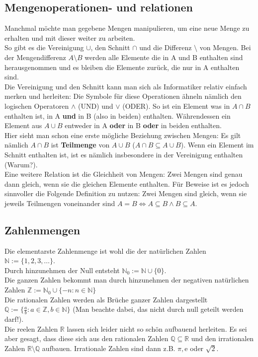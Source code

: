 \documentclass[parskip=full]{scrartcl}
\begin{document}
    \subsection{Mengenoperationen- und relationen}
        Manchmal möchte man gegebene Mengen manipulieren, um eine neue Menge zu erhalten und mit dieser weiter zu arbeiten.
        \\So gibt es die Vereinigung \(\cup\), den Schnitt \(\cap\) und die Differenz \(\setminus\) von Mengen. 
        Bei der Mengendifferenz \(A \setminus B\) werden alle Elemente die in A und B enthalten sind herausgenommen
        und es bleiben die Elemente zurück, die nur in A enthalten sind.
        \\Die Vereinigung und den Schnitt kann man sich als Informatiker relativ einfach merken und herleiten:
        Die Symbole für diese Operationen ähneln nämlich den logischen Operatoren \(\wedge\) (UND) und \(\vee\) (ODER).
        So ist ein Element was in \(A \cap B\) enthalten ist, in A \textbf{und} in B (also in beiden) enthalten. 
        Währendessen ein Element aus \(A \cup B\) entweder in A \textbf{oder} in B \textbf{oder} in beiden enthalten.
        \\Hier sieht man schon eine erste mögliche Beziehung zwischen Mengen: 
        Es gilt nämlich \(A \cap B\) ist \textbf{Teilmenge} von \(A \cup B\) \quad (\(A \cap B \subseteq A \cup B\)).
        Wenn ein Element im Schnitt enthalten ist, ist es nämlich insbesondere in der Vereinigung enthalten (Warum?).
        \\Eine weitere Relation ist die Gleichheit von Mengen: Zwei Mengen sind genau dann gleich, wenn sie die gleichen Elemente enthalten.
        Für Beweise ist es jedoch sinnvoller die Folgende Definition zu nutzen: 
        Zwei Mengen sind gleich, wenn sie jeweils Teilmengen voneinander sind \quad \(A = B \iff A \subseteq B \wedge B \subseteq A\).
        
    \subsection{Zahlenmengen}
        Die elementarste Zahlenmenge ist wohl die der natürlichen Zahlen \(\mathbb{N} := \{1, 2, 3, \dots\}\). 
        \\Durch hinzunehmen der Null entsteht \(\mathbb{N}_0 := \mathbb{N} \cup \{0\}\).
        \\Die ganzen Zahlen bekommt man durch hinzunehmen der negativen natürlichen Zahlen \(\mathbb{Z} := \mathbb{N}_0 \cup \{-n : n \in \mathbb{N}\}\)
        \\Die rationalen Zahlen werden als Brüche ganzer Zahlen dargestellt
        \\\(\mathbb{Q} := \{\frac{a}{b} : a \in \mathbb{Z}, b \in \mathbb{N}\}\)
        \quad(Man beachte dabei, das nicht durch null geteilt werden darf!).
        \\Die reelen Zahlen \(\mathbb{R}\) lassen sich leider nicht so schön aufbauend herleiten.
        Es sei aber gesagt, dass diese sich aus den rationalen Zahlen \(\mathbb{Q} \subseteq \mathbb{R}\) und den irrationalen Zahlen \(\mathbb{R} \setminus \mathbb{Q}\) aufbauen.
        Irrationale Zahlen sind dann z.B. \(\pi, \mathrm{e}\) oder \(\sqrt{2}\).
\end{document}

